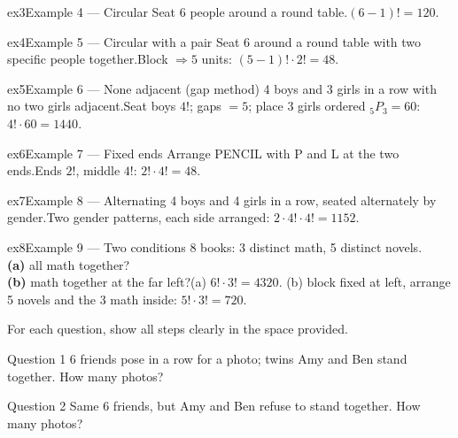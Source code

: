 \documentclass[11pt]{article}
\begin{document}
\begin{example}{ex3}{Example 4 --- Circular}
Seat 6 people around a round table.\soln $(6-1)!=120$.
\end{example}

\begin{example}{ex4}{Example 5 --- Circular with a pair}
Seat 6 around a round table with two specific people together.\soln Block $\Rightarrow5$ units: $(5-1)!\cdot2!=48$.
\end{example}

\begin{example}{ex5}{Example 6 --- None adjacent (gap method)}
4 boys and 3 girls in a row with no two girls adjacent.\soln Seat boys $4!$; gaps $=5$; place 3 girls ordered $_5P_3=60$: $4!\cdot60=1440$.
\end{example}

\begin{example}{ex6}{Example 7 --- Fixed ends}
Arrange PENCIL with P and L at the two ends.\soln Ends $2!$, middle $4!$: $2!\cdot4!=48$.
\end{example}

\begin{example}{ex7}{Example 8 --- Alternating}
4 boys and 4 girls in a row, seated alternately by gender.\soln Two gender patterns, each side arranged: $2\cdot4!\cdot4!=1152$.
\end{example}

\begin{example}{ex8}{Example 9 --- Two conditions}
8 books: 3 distinct math, 5 distinct novels. \\ \textbf{(a)} all math together? \\ \textbf{(b)} math together at the far left?\soln (a) $6!\cdot3!=4320$. (b) block fixed at left, arrange 5 novels and the 3 math inside: $5!\cdot3!=720$.
\end{example}

\clearpage
{}
For each question, show all steps clearly in the space provided.

\begin{qbox}{Question 1}
6 friends pose in a row for a photo; twins Amy and Ben stand together. How many photos?\workspace{2.4cm}
\end{qbox}

\begin{qbox}{Question 2}
Same 6 friends, but Amy and Ben refuse to stand together. How many photos?\workspace{2.4cm}
\end{qbox}
\end{document}
